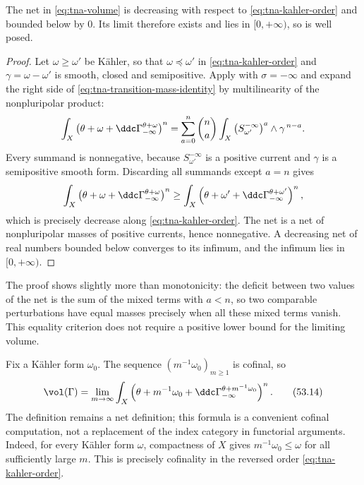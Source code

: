 \begin{proposition}
\label{prop:tna-volume-welldefined}
The net in \eqref{eq:tna-volume} is decreasing with respect to
\eqref{eq:tna-kahler-order} and bounded below by $0$.  Its limit
therefore exists and lies in $[0,+\infty)$, so
 is well posed.
\end{proposition}

\begin{proof}
Let $\omega\geq\omega'$ be K\"ahler, so that $\omega\preceq\omega'$ in
\eqref{eq:tna-kahler-order} and $\gamma=\omega-\omega'$ is smooth,
closed and semipositive.  Apply
 with $\sigma=-\infty$ and expand
the right side of \eqref{eq:tna-transition-mass-identity} by multilinearity
of the nonpluripolar product:
\[
 \int_X\left(\theta+\omega+
       \ddc\Gamma_{-\infty}^{\theta+\omega}\right)^n
 =\sum_{a=0}^n\binom na
   \int_X\left(S^{-\infty}_{\omega'}\right)^a\wedge\gamma^{\,n-a}.
\]
Every summand is nonnegative, because $S^{-\infty}_{\omega'}$ is a
positive current and $\gamma$ is a semipositive smooth form.  Discarding
all summands except $a=n$ gives
\[
 \int_X\left(\theta+\omega+
       \ddc\Gamma_{-\infty}^{\theta+\omega}\right)^n
 \geq
 \int_X\left(\theta+\omega'+
       \ddc\Gamma_{-\infty}^{\theta+\omega'}\right)^n ,
\]
which is precisely decrease along \eqref{eq:tna-kahler-order}.  The net is
a net of nonpluripolar masses of positive currents, hence nonnegative.  A
decreasing net of real numbers bounded below converges to its infimum, and
the infimum lies in $[0,+\infty)$.
\end{proof}

The proof shows slightly more than monotonicity: the deficit between two
values of the net is the sum of the mixed terms with $a<n$, so two comparable perturbations have equal masses precisely when all
these mixed terms vanish.  This equality criterion does not require a
positive lower bound for the limiting volume.

\begin{remark}
\label{rem:tna-cofinal-volume}
Fix a K\"ahler form $\omega_0$.  The sequence
$(m^{-1}\omega_0)_{m\geq1}$ is cofinal, so
\[
 \vol(\Gamma)
 =\lim_{m\to\infty}
 \int_X
 \left(\theta+m^{-1}\omega_0+
       \ddc\Gamma_{-\infty}^{\theta+m^{-1}\omega_0}\right)^n.
\tag{53.14}\label{eq:tna-cofinal-volume}
\]
The definition remains a net definition; this formula is a convenient
cofinal computation, not a replacement of the index category in
functorial arguments.
Indeed, for every K\"ahler form $\omega$, compactness of $X$ gives
$m^{-1}\omega_0\leq\omega$ for all sufficiently large $m$.  This is
precisely cofinality in the reversed order
\eqref{eq:tna-kahler-order}.
\end{remark}

